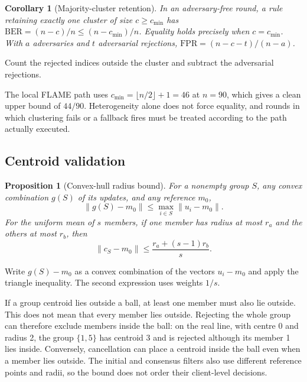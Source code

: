 \documentclass[journal]{IEEEtran}
\newtheorem{proposition}{Proposition}
\newtheorem{corollary}{Corollary}
\newcommand{\BER}{\mathrm{BER}}
\begin{document}
\begin{corollary}[Majority-cluster retention]\label{cor:majority}
In an adversary-free round, a rule retaining exactly one cluster of size $c\geq c_{\min}$ has $\BER=(n-c)/n\leq(n-c_{\min})/n$. Equality holds precisely when $c=c_{\min}$. With $a$ adversaries and $t$ adversarial rejections, $\mathrm{FPR}=(n-c-t)/(n-a)$.
\end{corollary}
\begin{IEEEproof}
Count the rejected indices outside the cluster and subtract the adversarial rejections.
\end{IEEEproof}
The local FLAME path uses $c_{\min}=\lfloor n/2\rfloor+1=46$ at $n=90$, which gives a clean upper bound of $44/90$. Heterogeneity alone does not force equality, and rounds in which clustering fails or a fallback fires must be treated according to the path actually executed.

\subsection{Centroid validation}
\begin{proposition}[Convex-hull radius bound]\label{prop:contraction}
For a nonempty group $S$, any convex combination $g(S)$ of its updates, and any reference $m_0$,
\[
\|g(S)-m_0\|\leq\max_{i\in S}\|u_i-m_0\|.
\]
For the uniform mean of $s$ members, if one member has radius at most $r_a$ and the others at most $r_b$, then
\[
\|c_S-m_0\|\leq\frac{r_a+(s-1)r_b}{s}.
\]
\end{proposition}
\begin{IEEEproof}
Write $g(S)-m_0$ as a convex combination of the vectors $u_i-m_0$ and apply the triangle inequality. The second expression uses weights $1/s$.
\end{IEEEproof}
If a group centroid lies outside a ball, at least one member must also lie outside. This does not mean that every member lies outside. Rejecting the whole group can therefore exclude members inside the ball: on the real line, with centre 0 and radius 2, the group $\{1,5\}$ has centroid 3 and is rejected although its member 1 lies inside. Conversely, cancellation can place a centroid inside the ball even when a member lies outside. The initial and consensus filters also use different reference points and radii, so the bound does not order their client-level decisions.
\end{document}
